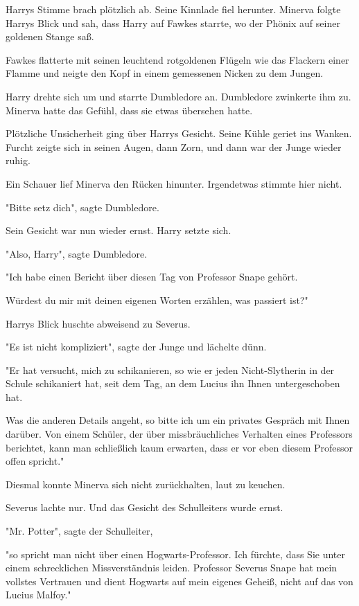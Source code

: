 {Harrys Stimme brach plötzlich ab. Seine Kinnlade fiel herunter. Minerva folgte Harrys Blick und sah, dass Harry auf Fawkes starrte, wo der Phönix auf seiner goldenen Stange saß.

Fawkes flatterte mit seinen leuchtend rotgoldenen Flügeln wie das Flackern einer Flamme und neigte den Kopf in einem gemessenen Nicken zu dem Jungen.

Harry drehte sich um und starrte Dumbledore an. Dumbledore zwinkerte ihm zu. Minerva hatte das Gefühl, dass sie etwas übersehen hatte.

Plötzliche Unsicherheit ging über Harrys Gesicht. Seine Kühle geriet ins Wanken. Furcht zeigte sich in seinen Augen, dann Zorn, und dann war der Junge wieder ruhig.

Ein Schauer lief Minerva den Rücken hinunter. Irgendetwas stimmte hier nicht.

"Bitte setz dich", sagte Dumbledore.

Sein Gesicht war nun wieder ernst. Harry setzte sich.

"Also, Harry", sagte Dumbledore.

"Ich habe einen Bericht über diesen Tag von Professor Snape gehört.

Würdest du mir mit deinen eigenen Worten erzählen, was passiert ist?"

Harrys Blick huschte abweisend zu Severus.

"Es ist nicht kompliziert", sagte der Junge und lächelte dünn.

"Er hat versucht, mich zu schikanieren, so wie er jeden Nicht-Slytherin in der Schule schikaniert hat, seit dem Tag, an dem Lucius ihn Ihnen untergeschoben hat.

Was die anderen Details angeht, so bitte ich um ein privates Gespräch mit Ihnen darüber. Von einem Schüler, der über missbräuchliches Verhalten eines Professors berichtet, kann man schließlich kaum erwarten, dass er vor eben diesem Professor offen spricht."

Diesmal konnte Minerva sich nicht zurückhalten, laut zu keuchen.

Severus lachte nur. Und das Gesicht des Schulleiters wurde ernst.

"Mr. Potter", sagte der Schulleiter,

"so spricht man nicht über einen Hogwarts-Professor. Ich fürchte, dass Sie unter einem schrecklichen Missverständnis leiden. Professor Severus Snape hat mein vollstes Vertrauen und dient Hogwarts auf mein eigenes Geheiß, nicht auf das von Lucius Malfoy."

}
